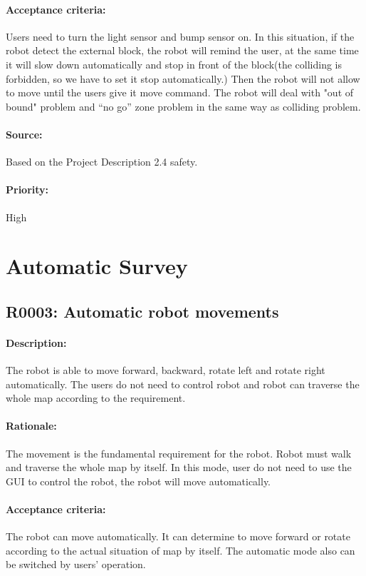 \documentclass[11pt, a4paper]{report}
\begin{document}
\paragraph{Acceptance criteria:}
Users need to turn the light sensor and bump sensor on. In this situation, if the robot detect the external block, the robot will remind the user, at the same time it will slow down automatically and stop in front of the block(the colliding is forbidden, so we have to set it stop automatically.) Then the robot will not allow to move until the users give it move command. The robot will deal with "out of bound" problem and “no go” zone problem in the same way as colliding problem.
\paragraph{Source:}
Based on the Project Description 2.4 safety.   
\paragraph{Priority:}
High


\section{Automatic Survey}
\subsection{R0003: Automatic robot movements }
\paragraph{Description:}
The robot is able to move forward, backward, rotate left and rotate right automatically. The users do not need to control robot and robot can traverse the whole map according to the requirement.
\paragraph{Rationale:}
The movement is the fundamental requirement for the robot. Robot must walk and traverse the whole map by itself. In this mode, user do not need to use the GUI to control the robot, the robot will move automatically.    
\paragraph{Acceptance criteria:}
The robot can move automatically. It can determine to move forward or rotate according to the actual situation of map by itself. The automatic mode also can be switched by users' operation.  
\end{document}
